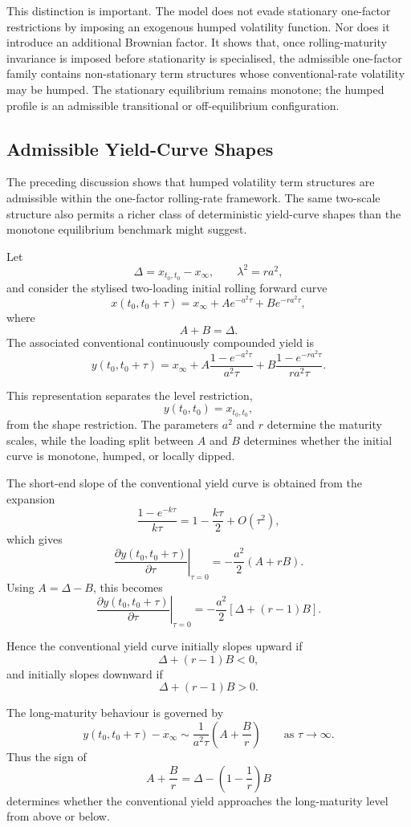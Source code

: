 \documentclass[12pt]{article}
\theoremstyle{statementstyle}
\begin{document}
This distinction is important. The model does not evade stationary one-factor restrictions by imposing an exogenous humped volatility function. Nor does it introduce an additional Brownian factor. It shows that, once rolling-maturity invariance is imposed before stationarity is specialised, the admissible one-factor family contains non-stationary term structures whose conventional-rate volatility may be humped. The stationary equilibrium remains monotone; the humped profile is an admissible transitional or off-equilibrium configuration.
\subsection{Admissible Yield-Curve Shapes}

The preceding discussion shows that humped volatility term structures are admissible within the one-factor rolling-rate framework. The same two-scale structure also permits a richer class of deterministic yield-curve shapes than the monotone equilibrium benchmark might suggest.

Let
\[
\Delta = x_{t_0,t_0}-x_\infty,
\qquad
\lambda^2 = r a^2,
\]
and consider the stylised two-loading initial rolling forward curve
\[
x(t_0,t_0+\tau)
=
x_\infty
+
A e^{-a^2\tau}
+
B e^{-r a^2\tau},
\]
where
\[
A+B=\Delta.
\]
The associated conventional continuously compounded yield is
\[
y(t_0,t_0+\tau)
=
x_\infty
+
A\frac{1-e^{-a^2\tau}}{a^2\tau}
+
B\frac{1-e^{-r a^2\tau}}{r a^2\tau}.
\]

This representation separates the level restriction,
\[
y(t_0,t_0)=x_{t_0,t_0},
\]
from the shape restriction. The parameters \(a^2\) and \(r\) determine the maturity scales, while the loading split between \(A\) and \(B\) determines whether the initial curve is monotone, humped, or locally dipped.

The short-end slope of the conventional yield curve is obtained from the expansion
\[
\frac{1-e^{-k\tau}}{k\tau}
=
1-\frac{k\tau}{2}+O(\tau^2),
\]
which gives
\[
\left.
\frac{\partial y(t_0,t_0+\tau)}{\partial \tau}
\right|_{\tau=0}
=
-\frac{a^2}{2}(A+rB).
\]
Using \(A=\Delta-B\), this becomes
\[
\left.
\frac{\partial y(t_0,t_0+\tau)}{\partial \tau}
\right|_{\tau=0}
=
-\frac{a^2}{2}
\left[
\Delta+(r-1)B
\right].
\]

Hence the conventional yield curve initially slopes upward if
\[
\Delta+(r-1)B<0,
\]
and initially slopes downward if
\[
\Delta+(r-1)B>0.
\]

The long-maturity behaviour is governed by
\[
y(t_0,t_0+\tau)-x_\infty
\sim
\frac{1}{a^2\tau}
\left(
A+\frac{B}{r}
\right)
\qquad
\text{as } \tau\to\infty.
\]
Thus the sign of
\[
A+\frac{B}{r}
=
\Delta-\left(1-\frac{1}{r}\right)B
\]
determines whether the conventional yield approaches the long-maturity level from above or below.
\end{document}
